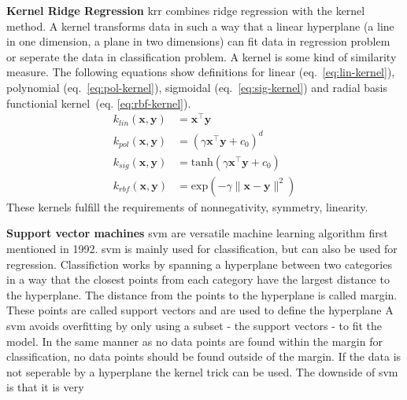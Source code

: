 \textbf{Kernel Ridge Regression}
\gls{krr} combines ridge regression with the kernel method. 
A kernel transforms data in such a way that a linear hyperplane (a line in one dimension, 
a plane in two dimensions) can fit data in regression problem or seperate the data in classification problem. 
A kernel is some kind of similarity measure. 
The following equations show definitions for 
linear (eq.~\ref{eq:lin-kernel}), 
polynomial (eq.~\ref{eq:pol-kernel}), 
sigmoidal (eq.~\ref{eq:sig-kernel}) and 
radial basis functionial kernel~(eq. \ref{eq:rbf-kernel}).
\begin{align}
    \label{eq:lin-kernel}
    k_{lin}(\mathbf{x},\mathbf{y}) &= \mathbf{x}^{\top} \mathbf{y} \\
    \label{eq:pol-kernel}
    k_{pol}(\mathbf{x}, \mathbf{y}) &= (\gamma \mathbf{x}^{\top} \mathbf{y} + c_0)^d \\
    \label{eq:sig-kernel}
    k_{sig}(\mathbf{x}, \mathbf{y}) &= \text{tanh}(\gamma \mathbf{x}^{\top} \mathbf{y} + c_0) \\
    \label{eq:rbf-kernel}
    k_{rbf}(\mathbf{x}, \mathbf{y}) &= \text{exp}(- \gamma \| \mathbf{x} -  \mathbf{y} \|^2) 
\end{align}
These kernels fulfill the requirements of nonnegativity, symmetry, linearity\cite{rupp2015machine}.
%
%

\textbf{Support vector machines} 
\Gls{svm} are versatile machine learning algorithm first mentioned in 1992\cite{boser1992training}. 
\Gls{svm} is mainly used for classification, but can also be used for regression. 
Classifiction works by spanning a hyperplane between two categories in a way that the closest points from each category have the largest distance to the hyperplane. 
The distance from the points to the hyperplane is called margin.
These points are called support vectors and are used to define the hyperplane 
A \gls{svm} avoids overfitting by only using a subset - the support vectors - to fit the model. 
In the same manner as no data points are found within the margin for classification, 
no data points should be found outside of the margin. 
If the data is not seperable by a hyperplane the kernel trick can be used. 
The downside of \gls{svm} is that it is very

